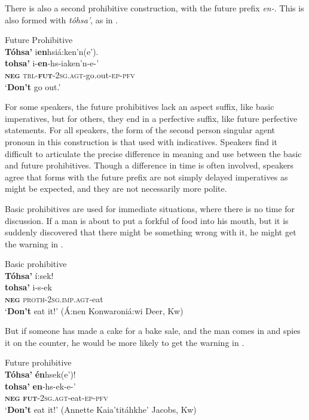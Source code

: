 \documentclass[output=paper,colorlinks,citecolor=brown]{langscibook}
\begin{document}
There is also a second prohibitive construction, with the future prefix \textit{en-}. This is also formed with \textit{tóhsa’}, as in .

\ea\label{ex:moh:27}Future Prohibitive\\
    \glll \textbf{Tóhsa’} i\textbf{en}hsiá:ken’n(e’). \\
         \textbf{tohsa’} i-\textbf{en}-hs-iaken’n-e-’\\
         \textbf{\textsc{neg}} \textsc{trl-\textbf{fut}-2sg.agt-}go.out-\textsc{ep-pfv}\\
    \glt ‘\textbf{Don’t} go out.’
\z

For some speakers, the future prohibitives lack an aspect suffix, like basic imperatives, but for others, they end in a perfective suffix, like future perfective statements.  For all speakers, the form of the second person singular agent pronoun in this construction is that used with indicatives. Speakers find it difficult to articulate the precise difference in meaning and use between the basic and future prohibitives. Though a difference in time is often involved, speakers agree that forms with the future prefix are not simply delayed imperatives as might be expected, and they are not necessarily more polite. 

Basic prohibitives are used for immediate situations, where there is no time for discussion. If a man is about to put a forkful of food into his mouth, but it is suddenly discovered that there might be something wrong with it, he might get the warning in .

\newpage
\ea\label{ex:moh:28} Basic prohibitive\\
    \glll \textbf{Tóhsa’} í:sek!\\
         \textbf{tohsa’} i-s-ek\\
         \textbf{\textsc{neg}} \textsc{proth-2sg.imp.agt}-eat \\
    \glt ‘\textbf{Don’t} eat it!’ (Á:nen Konwaroniá:wi Deer, Kw)
\z

But if someone has made a cake for a bake sale, and the man comes in and spies it on the counter, he would be more likely to get the warning in .

\ea\label{ex:moh:29}Future prohibitive\\
    \glll \textbf{Tóhsa’} \textbf{én}hsek(e’)! \\
         \textbf{tohsa’} \textbf{en}-hs-ek-e-’\\
         \textbf{\textsc{neg}} \textsc{\textbf{fut}-2sg.agt}-eat-\textsc{ep-pfv}\\
    \glt ‘\textbf{Don’t} eat it!’ (Annette Kaia’titáhkhe’ Jacobs, Kw)
\z
\end{document}
